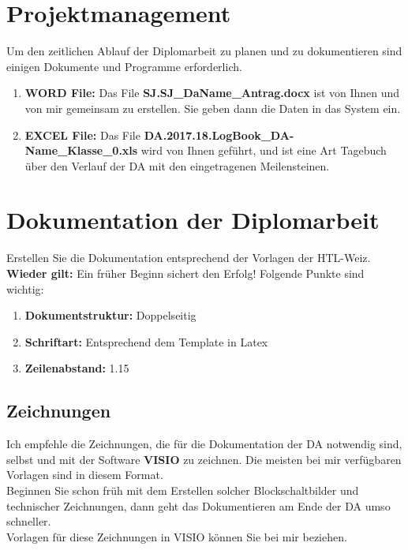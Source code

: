 \documentclass[a4paper, 12pt, xcolor=dvipsnames]{scrartcl}		%
\begin{document}
\section{Projektmanagement}
Um den zeitlichen Ablauf der Diplomarbeit zu planen und zu dokumentieren sind einigen Dokumente und Programme erforderlich.
\begin{enumerate}
\item\textbf{WORD File:} Das File \textbf{SJ.SJ\_DaName\_Antrag.docx} ist von Ihnen und von mir gemeinsam zu erstellen. Sie geben dann die Daten in das System ein.
\item\textbf{EXCEL File:} Das File \textbf{DA.2017.18.LogBook\_DA-Name\_Klasse\_0.xls} wird von Ihnen ge\-führt, und ist eine Art Tagebuch über den Verlauf der DA mit den eingetragenen Meilensteinen.
\end{enumerate}
\vspace{-0.6cm}



\section{Dokumentation der Diplomarbeit}
Erstellen Sie die Dokumentation entsprechend der Vorlagen der HTL-Weiz.\\
\textbf{Wieder gilt:} Ein früher Beginn sichert den Erfolg! Folgende Punkte sind wichtig:
\begin{enumerate}
\item\textbf{Dokumentstruktur:} Doppelseitig
\item\textbf{Schriftart:} Entsprechend dem Template in Latex
\item\textbf{Zeilenabstand:} 1.15
\end{enumerate}

\vspace{-0.6cm}

\subsection{Zeichnungen}
Ich empfehle die Zeichnungen, die für die Dokumentation der DA notwendig sind, selbst und mit der Software \textbf{VISIO} zu zeichnen. Die meisten bei mir verfügbaren Vorlagen sind in diesem Format.\\
Beginnen Sie schon früh mit dem Erstellen solcher Blockschaltbilder und technischer Zeichnungen, dann geht das Dokumentieren am Ende der DA umso schneller.\\
Vorlagen für diese Zeichnungen in VISIO können Sie bei mir beziehen.
\vspace{-0.6cm}
\end{document}
